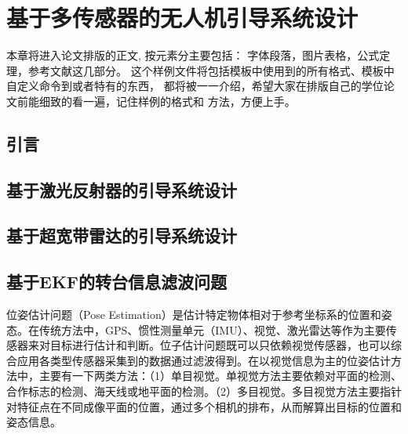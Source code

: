 \chapter{基于多传感器的无人机引导系统设计}
\label{chap:main}
本章将进入论文排版的正文, 按元素分主要包括：
{\kai 字体段落，图片表格，公式定理，参考文献}这几部分。
这个样例文件将包括模板中使用到的所有格式、模板中自定义命令到或者特有的东西，
都将被一一介绍，希望大家在排版自己的学位论文前能细致的看一遍，记住样例的格式和
方法，方便上手。
\cite{ELIDRISSI94}

\section{引言}

\section{基于激光反射器的引导系统设计}

\section{基于超宽带雷达的引导系统设计}

\section{基于EKF的转台信息滤波问题}
位姿估计问题（Pose Estimation）是估计特定物体相对于参考坐标系的位置和姿态。在传统方法中，GPS、惯性测量单元（IMU）、视觉、激光雷达等作为主要传感器来对目标进行估计和判断。位子估计问题既可以只依赖视觉传感器，也可以综合应用各类型传感器采集到的数据通过滤波得到。在以视觉信息为主的位姿估计方法中，主要有一下两类方法：（1）单目视觉。单视觉方法主要依赖对平面的检测、合作标志的检测、海天线或地平面的检测。（2）多目视觉。多目视觉方法主要指针对特征点在不同成像平面的位置，通过多个相机的排布，从而解算出目标的位置和姿态信息。

